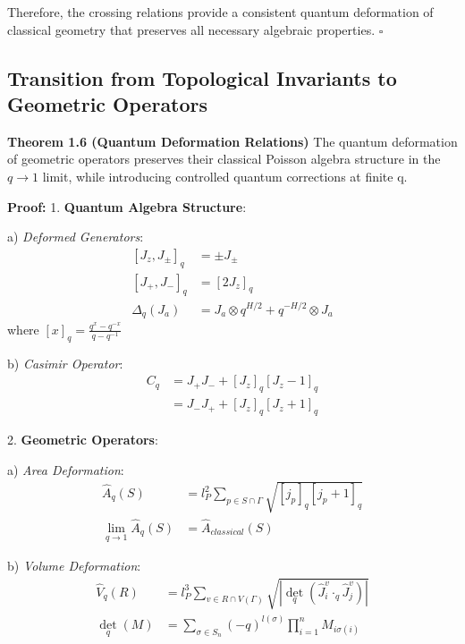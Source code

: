 \documentclass[12pt,a4paper]{article}
\begin{document}
Therefore, the crossing relations provide a consistent quantum deformation of classical geometry that preserves all necessary algebraic properties. $\square$

\subsection{Transition from Topological Invariants to Geometric Operators}

\textbf{Theorem 1.6 (Quantum Deformation Relations)}
The quantum deformation of geometric operators preserves their classical Poisson algebra structure in the $q \to 1$ limit, while introducing controlled quantum corrections at finite q.

\textbf{Proof:}
1. \textbf{Quantum Algebra Structure}:
   
   a) \textit{Deformed Generators}:
      \[
      \begin{aligned}
      [J_z, J_{\pm}]_q &= \pm J_{\pm} \\
      [J_+, J_-]_q &= [2J_z]_q \\
      \Delta_q(J_a) &= J_a \otimes q^{H/2} + q^{-H/2} \otimes J_a
      \end{aligned}
      \]
      where $[x]_q = \frac{q^x - q^{-x}}{q - q^{-1}}$
   
   b) \textit{Casimir Operator}:
      \[
      \begin{aligned}
      C_q &= J_+J_- + [J_z]_q[J_z-1]_q \\
      &= J_-J_+ + [J_z]_q[J_z+1]_q
      \end{aligned}
      \]

2. \textbf{Geometric Operators}:
   
   a) \textit{Area Deformation}:
      \[
      \begin{aligned}
      \hat{A}_q(S) &= l_P^2 \sum_{p \in S \cap \Gamma} \sqrt{[j_p]_q[j_p+1]_q} \\
      \lim_{q \to 1}\hat{A}_q(S) &= \hat{A}_{classical}(S)
      \end{aligned}
      \]
   
   b) \textit{Volume Deformation}:
      \[
      \begin{aligned}
      \hat{V}_q(R) &= l_P^3 \sum_{v \in R \cap V(\Gamma)} \sqrt{|\det_q(\hat{J}_i^v \cdot_q \hat{J}_j^v)|} \\
      \det_q(M) &= \sum_{\sigma \in S_n} (-q)^{l(\sigma)}\prod_{i=1}^n M_{i\sigma(i)}
      \end{aligned}
      \]
\end{document}
